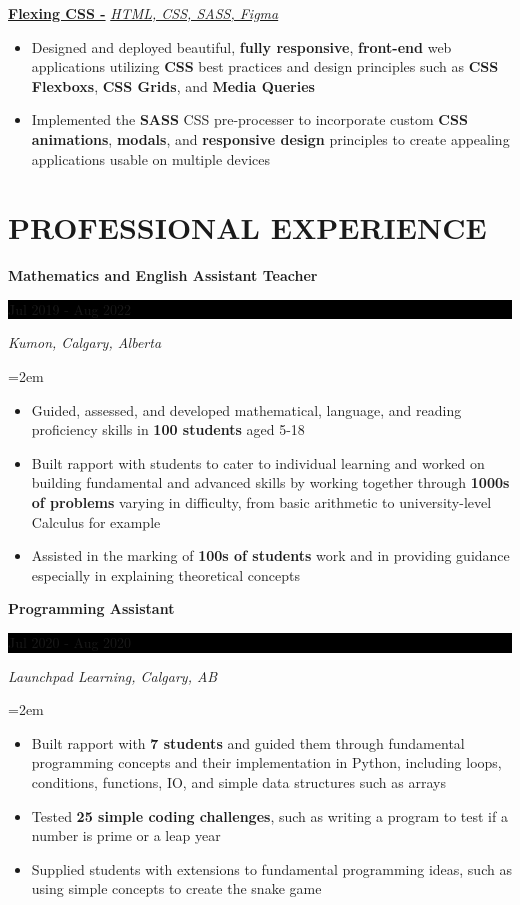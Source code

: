 \documentclass[10pt]{article}
\newcommand{\NewPart}[1]{\section*{\uppercase{#1}}}
\newcommand{\EducationEntry}[4]{
    \noindent \textbf{#1} \hfill      %
    \colorbox{Black}{
      \parbox{8.5em}{
      \hfill\color{White}#2}} \par  %
    \noindent \textit{#3} \par        %
    \noindent\hangindent=2em\hangafter=0 \small #4 %
    \normalsize \par}
\newcommand{\WorkEntry}[4]{       %
    \noindent \textbf{#1} \hfill      %
    \colorbox{Black}{%
      \parbox{9em}{%
      \hfill\color{White}#2}} \par   %
        \noindent \textit{#3} \par        %
    \noindent\hangindent=2em\hangafter=0 \small #4 %
    \normalsize \par}
\newcommand{\ProjectEntry}[4]{         %
    \noindent \textbf{#1} \noindent \textit{#3} \hfill {#2} \par
    \noindent \small #4 %
    \normalsize \par}
\begin{document}
{\ProjectEntry
{\normalsize\href{https://github.com/nandanjp/Flexing-CSS/tree/main}
{Flexing CSS -}}{}
{\normalsize\href{https://github.com/nandanjp/Flexing-CSS/tree/main}
{HTML, CSS, SASS, Figma}}
{\begin{itemize} \itemsep -1pt
    \item Designed and deployed beautiful, \textbf{fully responsive}, \textbf{front-end} web applications utilizing \textbf{CSS} best practices and design principles such as \textbf{CSS Flexboxs}, \textbf{CSS Grids}, and \textbf{Media Queries}
    \item Implemented the \textbf{SASS} CSS pre-processer to incorporate custom \textbf{CSS animations}, \textbf{modals}, and \textbf{responsive design} principles to create appealing applications usable on multiple devices
    \end{itemize}
}

\NewPart{Professional Experience}{}
\WorkEntry
{Mathematics and English Assistant Teacher}
{Jul 2019 - Aug 2022}
{Kumon, Calgary, Alberta}
{\begin{itemize} \itemsep -1pt
	\item Guided, assessed, and developed mathematical, language, and reading proficiency skills in \textbf{100 students} aged 5-18
	\item Built rapport with students to cater to individual learning and worked on building fundamental and advanced skills by working together through \textbf{1000s of problems} varying in difficulty, from basic arithmetic to university-level Calculus for example
	\item Assisted in the marking of \textbf{100s of students} work and in providing guidance especially in explaining theoretical concepts
	\end{itemize}}

\WorkEntry
{Programming Assistant}
{Jul 2020 - Aug 2020}
{Launchpad Learning, Calgary, AB}
{\begin{itemize} \itemsep -1pt
	\item Built rapport with \textbf{7 students} and guided them through fundamental programming concepts and their implementation in Python, including loops, conditions, functions, IO, and simple data structures such as arrays
	\item Tested \textbf{25 simple coding challenges}, such as writing a program to test if a number is prime or a leap year
	\item Supplied students with extensions to fundamental programming ideas, such as using simple concepts to create the snake game
	\end{itemize}}

}
\end{document}
